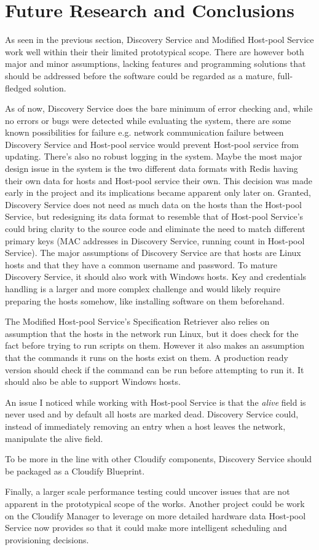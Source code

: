 \newpage

\section{Future Research and Conclusions} \label{future}

As seen in the previous section, Discovery Service and Modified Host-pool Service work well within their their limited prototypical scope. There are however both major and minor assumptions, lacking features and programming solutions that should be addressed before the software could be regarded as a mature, full-fledged solution.

As of now, Discovery Service does the bare minimum of error checking and, while no errors or bugs were detected while evaluating the system, there are some known possibilities for failure e.g. network communication failure between Discovery Service and Host-pool service would prevent Host-pool service from updating. There's also no robust logging in the system.
Maybe the most major design issue in the system is the two different data formats with Redis having their own data for hosts and Host-pool service their own. This decision was made early in the project and its implications became apparent only later on. Granted, Discovery Service does not need as much data on the hosts than the Host-pool Service, but redesigning its data format to resemble that of Host-pool Service's could bring clarity to the source code and eliminate the need to match different primary keys (MAC addresses in Discovery Service, running count in Host-pool Service).
The major assumptions of Discovery Service are that hosts are Linux hosts and that they have a common username and password. To mature Discovery Service, it should also work with Windows hosts. Key and credentials handling is a larger and more complex challenge and would likely require preparing the hosts somehow, like installing software on them beforehand.

The Modified Host-pool Service's Specification Retriever also relies on assumption that the hosts in the network run Linux, but it does check for the fact before trying to run scripts on them. However it also makes an assumption that the commands it runs on the hosts exist on them. A production ready version should check if the command can be run before attempting to run it. It should also be able to support Windows hosts.

An issue I noticed while working with Host-pool Service is that the \textit{alive} field is never used and by default all hosts are marked dead. Discovery Service could, instead of immediately removing an entry when a host leaves the network, manipulate the alive field.

To be more in the line with other Cloudify components, Discovery Service should be packaged as a Cloudify Blueprint. 

Finally, a larger scale performance testing could uncover issues that are not apparent in the prototypical scope of the works. Another project could be work on the Cloudify Manager to leverage on more detailed hardware data Host-pool Service now provides so that it could make more intelligent scheduling and provisioning decisions.
